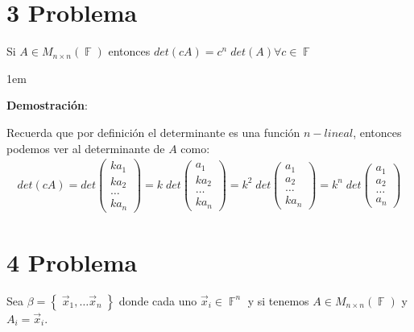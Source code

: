\documentclass[12pt, fleqn]{article}                             %
\newenvironment{SmallIndentation}[1][0.75em]                    %
        {\begin{adjustwidth}{#1}{}\begin{footnotesize}}             %
        {\end{footnotesize}\end{adjustwidth}}                       %
\theoremstyle{break}                                            %
\DeclareMathOperator \GenericField {\mathbb{F}}                 %
\newcommand{\Set}[1]    {\left\{ \; #1 \; \right\}}             %
\newcommand{\Wrap}[1]    {\left( #1 \right)}                    %
\newcommand{\pVector}[1]                                        %
        { \ensuremath{\begin{pmatrix}#1\end{pmatrix}} }             %
\begin{document}
\vspace{1em}
\section{3 Problema}


    Si $A \in M_{n \times n}(\GenericField)$ entonces $det(cA) = c^n \; det(A) \forall c \in \GenericField$
    \begin{SmallIndentation}[1em]
        \textbf{Demostración}:
        
        Recuerda que por definición el determinante es una función $n-lineal$, entonces
        podemos ver al determinante de $A$ como:
        \begin{align*}
            det\Wrap{cA}
                = det\pVector{ka_1 \\ ka_2 \\ \ldots  \\ka_n }              
                = k \; det\pVector{a_1 \\ ka_2 \\ \ldots  \\ka_n }          
                = k^2 \; det\pVector{a_1 \\ a_2 \\ \ldots  \\ka_n }         
                = k^n \; det\pVector{a_1 \\ a_2 \\ \ldots  \\ a_n }
        \end{align*}
    
    \end{SmallIndentation}




\clearpage
\section{4 Problema}

    Sea $\beta = \Set{\vec x_1, \dots \vec x_n}$ donde cada uno $\vec x_i \in \GenericField^n$
    y si tenemos $A \in M_{n \times n}(\GenericField)$ y $A_i = \vec x_i$.
\end{document}
